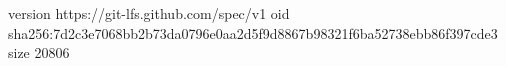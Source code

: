 version https://git-lfs.github.com/spec/v1
oid sha256:7d2c3e7068bb2b73da0796e0aa2d5f9d8867b98321f6ba52738ebb86f397cde3
size 20806
